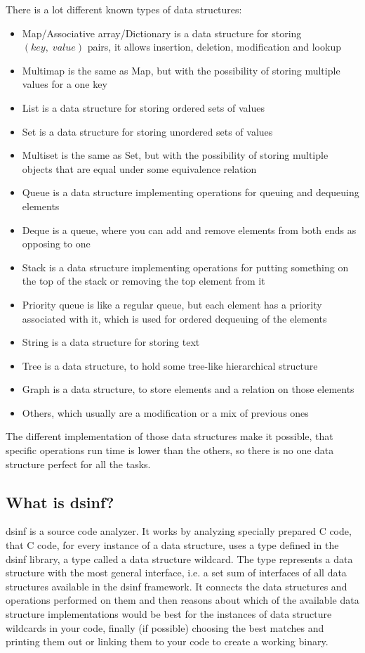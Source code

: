 \documentclass[a4paper,11pt]{article}
\begin{document}
	There is a lot different known types of data structures:
	\begin{itemize}
		\item Map/Associative array/Dictionary is a data structure for storing $(key,\;value)$ pairs, it allows
			insertion, deletion, modification and lookup
		\item Multimap is the same as Map, but with the possibility of storing multiple values for a one key
		\item List is a data structure for storing ordered sets of values
		\item Set is a data structure for storing unordered sets of values
		\item Multiset is the same as Set, but with the possibility of storing multiple objects that are equal
			under some equivalence relation
		\item Queue is a data structure implementing operations for queuing and dequeuing elements
		\item Deque is a queue, where you can add and remove elements from both ends as opposing to one
		\item Stack is a data structure implementing operations for putting something on the top of the stack or
			removing the top element from it
		\item Priority queue is like a regular queue, but each element has a priority associated with it, which
			is used for ordered dequeuing of the elements
		\item String is a data structure for storing text
		\item Tree is a data structure, to hold some tree-like hierarchical structure
		\item Graph is a data structure, to store elements and a relation on those elements
		\item Others, which usually are a modification or a mix of previous ones
	\end{itemize}

	The different implementation of those data structures make it possible, that specific operations run time is
	lower than the others, so there is no one data structure perfect for all the tasks.

	\subsection{What is dsinf?} \label{sub:intro}

		dsinf is a source code analyzer. It works by analyzing specially prepared C code, that C code, for every
		instance of a data structure, uses a type defined in the dsinf library, a type called a data
		structure wildcard. The type represents a data structure with the most general interface, i.e. a set sum
		of interfaces of all data structures available in the dsinf framework. It connects the data structures
		and operations performed on them and then reasons about which of the available data structure
		implementations would be best for the instances of data structure wildcards in your code, finally (if
		possible) choosing the best matches and printing them out or linking them to your code to create a
		working binary.
\end{document}
